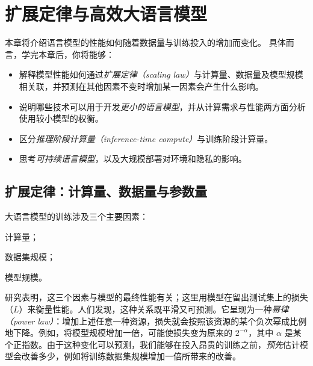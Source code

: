 \chapter[扩展定律与效率]{扩展定律与高效大语言模型}\label{chap:scaling}

\begin{learningbox}
本章将介绍语言模型的性能如何随着数据量与训练投入的增加而变化。
具体而言，学完本章后，你将能够：
\begin{itemize}[leftmargin=*, nosep]
    \item 解释模型性能如何通过{\em 扩展定律（scaling law）}与计算量、数据量及模型规模相关联，并预测在其他因素不变时增加某一因素会产生什么影响。
    \item 说明哪些技术可以用于开发{\em 更小的语言模型}，并从计算需求与性能两方面分析使用较小模型的权衡。
    \item 区分{\em 推理阶段计算量（inference-time compute）}与训练阶段计算量。
    \item 思考\emph{可持续语言模型}，以及大规模部署对环境和隐私的影响。
\end{itemize}
\end{learningbox}

\section{扩展定律：计算量、数据量与参数量}
\label{sec:scaling-laws}
大语言模型的训练涉及三个主要因素：\begin{enumerate*}[label=(\arabic*)]
    \item 计算量；
    \item 数据集规模；
    \item 模型规模。
\end{enumerate*}
研究表明，这三个因素与模型的最终性能有关；这里用模型在留出测试集上的损失（$L$）来衡量性能。人们发现，这种关系既平滑又可预测。它呈现为一种\emph{幂律（power law）}：增加上述任意一种资源，损失就会按照该资源的某个负次幂成比例地下降。例如，将模型规模增加一倍，可能使损失变为原来的 $2^{-\alpha}$，其中 $\alpha$ 是某个正指数。由于这种变化可以预测，我们能够在投入昂贵的训练之前，\emph{预先}估计模型会改善多少，例如将训练数据集规模增加一倍所带来的改善。

